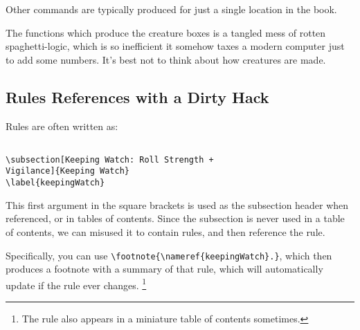 \documentclass[a4paper,openany]{book}
\begin{document}
\begin{multicols}{2}

Other commands are typically produced for just a single location in the book.

The functions which produce the creature boxes is a tangled mess of rotten spaghetti-logic, which is so inefficient it somehow taxes a modern computer just to add some numbers.
It's best not to think about how creatures are made.

\subsection{Rules References with a Dirty Hack}

Rules are often written as:

\begin{verbatim}

\subsection[Keeping Watch: Roll Strength +
Vigilance]{Keeping Watch}
\label{keepingWatch}

\end{verbatim}

This first argument in the square brackets is used as the subsection header when referenced, or in tables of contents.
Since the subsection is never used in a table of contents, we can misused it to contain rules, and then reference the rule.

Specifically, you can use \verb"\footnote{\nameref{keepingWatch}.}", which then produces a footnote with a summary of that rule, which will automatically update if the rule ever changes.
\footnote{The rule also appears in a miniature table of contents sometimes.}

\end{multicols}
\end{document}
